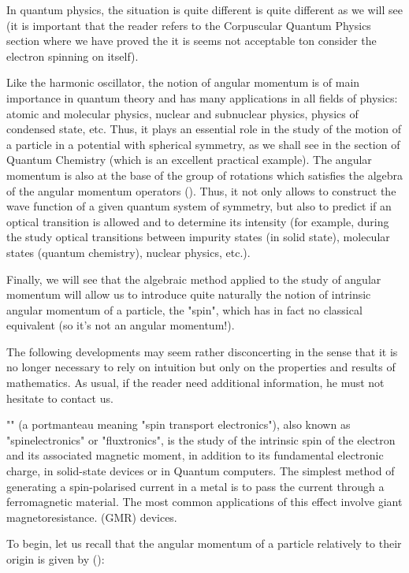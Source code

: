 	In quantum physics, the situation is quite different is quite different as we will see (it is important that the reader refers to the Corpuscular Quantum Physics section where we have proved the it is seems not acceptable ton consider the electron spinning on itself).

	Like the harmonic oscillator, the notion of angular momentum is of main importance in quantum theory and has many applications in all fields of physics: atomic and molecular physics, nuclear and subnuclear physics, physics of condensed state, etc. Thus, it plays an essential role in the study of the motion of a particle in a potential with spherical symmetry, as we shall see in the section of Quantum Chemistry (which is an excellent practical example). The angular momentum is also at the base of the group of rotations which satisfies the algebra of the angular momentum operators (). Thus, it not only allows to construct the wave function of a given quantum system of symmetry, but also to predict if an optical transition is allowed and to determine its intensity (for example, during the study optical transitions between impurity states (in solid state), molecular states (quantum chemistry), nuclear physics, etc.).
	
	Finally, we will see that the algebraic method applied to the study of angular momentum will allow us to introduce quite naturally the notion of intrinsic angular momentum of a particle, the "spin", which has in fact no classical equivalent (so it's not an angular momentum!).

	The following developments may seem rather disconcerting in the sense that it is no longer necessary to rely on intuition but only on the properties and results of mathematics. As usual, if the reader need additional information, he must not hesitate to contact us.
	\begin{tcolorbox}[title=Remark,colframe=black,arc=10pt]
	"" (a portmanteau meaning "spin transport electronics"), also known as "spinelectronics" or "fluxtronics", is the study of the intrinsic spin of the electron and its associated magnetic moment, in addition to its fundamental electronic charge, in solid-state devices or in Quantum computers. The simplest method of generating a spin-polarised current in a metal is to pass the current through a ferromagnetic material. The most common applications of this effect involve giant magnetoresistance.  (GMR) devices. 
	\end{tcolorbox}
	To begin, let us recall that the angular momentum of a particle relatively to their origin is given by ():
	
